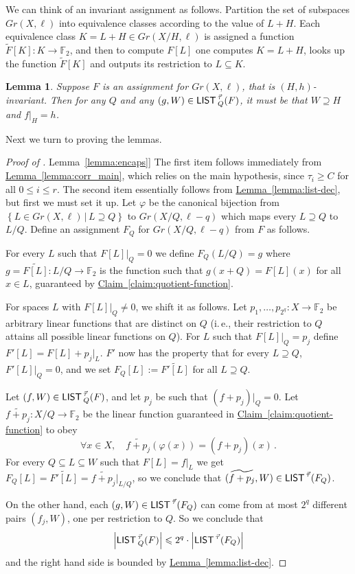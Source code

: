 \documentclass[11pt]{article}
\numberwithin{equation}{section}
\newtheorem{lemma}[theorem]{Lemma}
\theoremstyle{definition}
\theoremstyle{plain}
\newcommand{\ie}{i.\,e.}
\newcommand{\expref}[2]{\hyperref[#2]{#1~\ref{#2}}}
\newcommand\card[1]{\left| {#1} \right|}
\newcommand\Set[2]{ \left\{ #1 \,  \vert  \, #2\right\} }
\renewcommand\ge{\geqslant}
\renewcommand\le{\leqslant}
\renewcommand\subset{\subseteq}
\renewcommand\supset{\supseteq}
\def\M{{\sf LIST\,}}
\def\F{\mathbb{F}}
\begin{document}
We can think of an invariant assignment as follows. Partition the set of subspaces  $Gr(X,\ell)$ into equivalence classes according to the value of $L+H$. Each equivalence class $K = L+H\in Gr(X/H,\ell)$ is assigned a function $\tilde F[K]:K\to\F_2$, and then to compute $F[L]$ one computes $K = L+H$, looks up the function $\tilde F[K]$ and outputs its restriction to $L\subset K$.

\begin{lemma}\label{lemma:test-side}
Suppose $F$ is an assignment for $Gr(X,\ell)$, that is $(H,h)$-invariant. Then for any $Q$ and any $(g,W)\in \M_Q^{\vec\tau}(F)$, it must be that $W\supset H$ and  $f|_{H} = h$.
\end{lemma}
%

Next we turn to proving the lemmas.
\begin{proof}[Proof of \expref{Lemma}{lemma:encaps}]
%
The first item follows immediately from \expref{Lemma}{lemma:corr_main}, which relies on the main hypothesis, since $\tau_i\ge C$ for all $0\le i\le r$.
%
The second item essentially follows from \expref{Lemma}{lemma:list-dec}, but first we must set it up.
%
Let  $\varphi$ be the canonical bijection from $\Set{L\in Gr(X,\ell)}{L\supset Q}$ to $Gr(X/Q,\ell-q)$ which maps every $L\supset Q$ to $L/Q$. Define an assignment $F_{Q}$ for $Gr(X/Q,\ell-q)$ from $F$ as follows.

For every $L$ such that $F[L]|_Q=0$ we define $F_Q(L/Q) = g$ where $g=\widetilde{F[L]}:L/Q\to\F_2$ is the function such that  $g(x+Q) = F[L](x)$ for all $x\in L$, guaranteed by \expref{Claim}{claim:quotient-function}.

For spaces $L$ with $F[L]|_Q \neq 0$, we shift it as follows. Let $p_1,\ldots,p_{2^q}:X\to \F_2$ be arbitrary linear functions that are distinct on $Q$ (\ie, their restriction to $Q$ attains all possible linear functions on $Q$). For $L$ such that $F[L]|_Q = p_j$ define $F'[L] = F[L] + p_j|_L$. $F'$ now has the property  that for every $L\supset Q$, $F'[L]|_Q=0$, and we set $F_Q[L] := \widetilde{F'[L]}$ for all $L\supset Q$.

Let $(f,W) \in \M^{\vec\tau}_Q(F)$, and let $p_j$ be such that $(f+p_j)|_Q=0$. Let $\widetilde{f+p_j}: X/Q\to\F_2$ be the linear function guaranteed in \expref{Claim}{claim:quotient-function} to obey
%
\[ \forall x\in X,\quad \widetilde{f+p_j}(\varphi(x)) = (f+p_j)(x)\,.
\]
%
For every $Q\subset L\subset W$ such that $F[L] = f|_L$ we get  $F_Q[L] = \widetilde{F'[L]} = \widetilde{f+p_j}|_{L/Q}$, so we conclude that $(\widetilde{f+p_j},W)\in \M^{\vec\tau}(F_Q)$.

On the other hand, each $(g,W)\in \M^{\vec\tau}(F_Q)$ can come from at most $2^q$ different pairs $(f_j,W)$, one per restriction to $Q$. So we conclude that
\[ \card{\M^{\vec\tau}_Q(F)} \le 2^q \cdot \card{\M^{\vec\tau}(F_Q)}
\] and the right hand side is bounded by \expref{Lemma}{lemma:list-dec}.
\end{proof}
%
\end{document}
